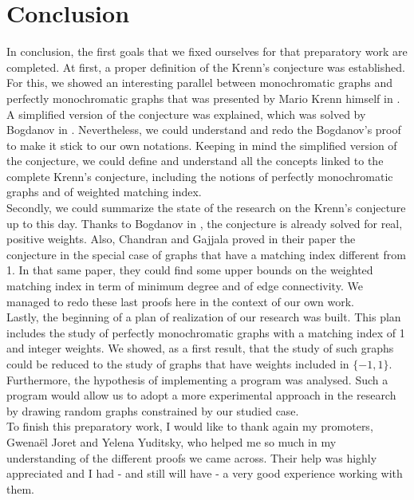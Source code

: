 \setcounter{secnumdepth}{-1}

\chapter{Conclusion}

In conclusion, the first goals that we fixed ourselves for that preparatory work are completed. At first, a proper definition of the Krenn's conjecture was established. For this, we showed an interesting parallel between monochromatic graphs and perfectly monochromatic graphs that was presented by Mario Krenn himself in \cite{wordpress}. A simplified version of the conjecture was explained, which was solved by Bogdanov in \cite{bogdanov}. Nevertheless, we could understand and redo the Bogdanov's proof to make it stick to our own notations. Keeping in mind the simplified version of the conjecture, we could define and understand all the concepts linked to the complete Krenn's conjecture, including the notions of perfectly monochromatic graphs and of weighted matching index. \\

Secondly, we could summarize the state of the research on the Krenn's conjecture up to this day. Thanks to Bogdanov in \cite{bogdanov}, the conjecture is already solved for real, positive weights. Also, Chandran and Gajjala proved in their paper \cite{chandran} the conjecture in the special case of graphs that have a matching index different from 1. In that same paper, they could find some upper bounds on the weighted matching index in term of minimum degree and of edge connectivity. We managed to redo these last proofs here in the context of our own work. \\

Lastly, the beginning of a plan of realization of our research was built. This plan includes the study of perfectly monochromatic graphs with a matching index of 1 and integer weights. We showed, as a first result, that the study of such graphs could be reduced to the study of graphs that have weights included in $\{-1, 1\}$. Furthermore, the hypothesis of implementing a program was analysed. Such a program would allow us to adopt a more experimental approach in the research by drawing random graphs constrained by our studied case. \\

To finish this preparatory work, I would like to thank again my promoters, Gwenaël Joret and Yelena Yuditsky, who helped me so much in my understanding of the different proofs we came across. Their help was highly appreciated and I had - and still will have - a very good experience working with them.
